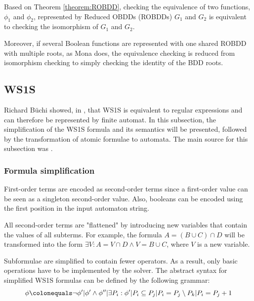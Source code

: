 \documentclass[pdflatex,sn-mathphys-num]{sn-jnl}%
\theoremstyle{thmstyleone}%
\theoremstyle{thmstyletwo}%
\theoremstyle{thmstylethree}%
\begin{document}
        \vspace*{0.5em}

        Based on Theorem \ref{theorem:ROBDD}, checking the equivalence of two functions, $\phi_1$ and $\phi_2$, represented by Reduced OBDDs (ROBDDs) $G_1$ and $G_2$ is equivalent to checking the isomorphism of $G_1$ and $G_2$.

        Moreover, if several Boolean functions are represented with one shared ROBDD with multiple roots, as Mona does, the equivalence checking is reduced from isomorphism checking to simply checking the identity of the BDD roots.


    \subsection{WS1S}
        Richard Büchi showed, in \cite{Buchi}, that WS1S is equivalent to regular expressions and can therefore be represented by finite automat. In this subsection, the simplification of the WS1S formula and its semantics will be presented, followed by the transformation of atomic formulae to automata. The main source for this subsection was \cite{Mona_manual}.

        \subsubsection*{Formula simplification}
            First-order terms are encoded as second-order terms since a first-order value can be seen as a singleton second-order value. Also, booleans can be encoded using the first position in the input automaton string.

            All second-order terms are "flattened" by introducing new variables that contain the values of all subterms. For example, the formula $A = (B \cup C) \cap D$ will be transformed into the form $\exists V : A = V \cap D \land V = B \cup C$, where $V$ is a new variable.

            Subformulae are simplified to contain fewer operators. As a result, only basic operations have to be implemented by the solver. The abstract syntax for simplified WS1S formulas can be defined by the following grammar:
            $$
                \phi \colonequals \neg \phi' | \phi' \land \phi'' | \exists P_i : \phi' | P_i \subseteq P_j | P_i = P_j \setminus P_k | P_i = P_j + 1
            $$
\end{document}
